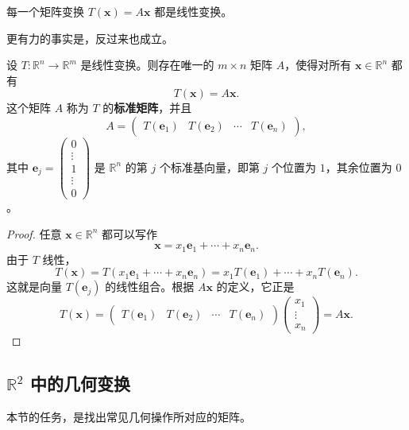 \begin{theorem}
每一个矩阵变换 $T(\mathbf{x})=A\mathbf{x}$ 都是线性变换。
\end{theorem}
更有力的事实是，反过来也成立。

\begin{theorem}
设 $T:\mathbb{R}^n\to\mathbb{R}^m$ 是线性变换。则存在唯一的 $m\times n$ 矩阵 $A$，使得对所有 $\mathbf{x}\in\mathbb{R}^n$ 都有
\[ T(\mathbf{x})=A\mathbf{x}. \]
这个矩阵 $A$ 称为 $T$ 的\textbf{标准矩阵}，并且
\[ A=\begin{pmatrix}T(\mathbf{e}_1)&T(\mathbf{e}_2)&\cdots&T(\mathbf{e}_n)\end{pmatrix}, \]
其中 $\mathbf{e}_j=\begin{pmatrix}0\\\vdots\\1\\\vdots\\0\end{pmatrix}$ 是 $\mathbb{R}^n$ 的第 $j$ 个标准基向量，即第 $j$ 个位置为 $1$，其余位置为 $0$。
\end{theorem}
\begin{proof}
任意 $\mathbf{x}\in\mathbb{R}^n$ 都可以写作
\[
\mathbf{x}=x_1\mathbf{e}_1+\cdots+x_n\mathbf{e}_n.
\]
由于 $T$ 线性，
\[
T(\mathbf{x})=T(x_1\mathbf{e}_1+\cdots+x_n\mathbf{e}_n)=x_1T(\mathbf{e}_1)+\cdots+x_nT(\mathbf{e}_n).
\]
这就是向量 $T(\mathbf{e}_j)$ 的线性组合。根据 $A\mathbf{x}$ 的定义，它正是
\[
T(\mathbf{x})=\begin{pmatrix}T(\mathbf{e}_1)&T(\mathbf{e}_2)&\cdots&T(\mathbf{e}_n)\end{pmatrix}\begin{pmatrix}x_1\\\vdots\\x_n\end{pmatrix}=A\mathbf{x}.
\]
\end{proof}

\subsection{\texorpdfstring{$\mathbb{R}^2$}{R2} 中的几何变换}
本节的任务，是找出常见几何操作所对应的矩阵。

